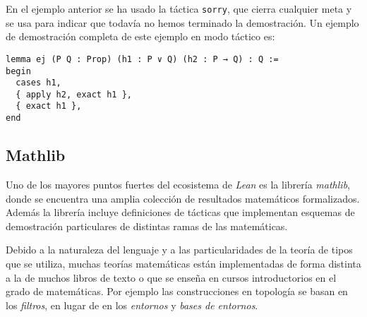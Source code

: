 En el ejemplo anterior se ha usado la táctica \lstinline{sorry}, que cierra
cualquier meta y se usa para indicar que todavía no hemos terminado la
demostración. Un ejemplo de demostración completa de este ejemplo en modo
táctico es:

\begin{lstlisting}
lemma ej (P Q : Prop) (h1 : P ∨ Q) (h2 : P → Q) : Q :=
begin
  cases h1,
  { apply h2, exact h1 },
  { exact h1 },
end
\end{lstlisting}

\subsection{Mathlib}

Uno de los mayores puntos fuertes del ecosistema de \textit{Lean} es la librería
\textit{mathlib}, donde se encuentra una amplia colección de resultados
matemáticos formalizados. Además la librería incluye definiciones de tácticas
que implementan esquemas de demostración particulares de distintas ramas de las
matemáticas.

Debido a la naturaleza del lenguaje y a las particularidades de la teoría de
tipos que se utiliza, muchas teorías matemáticas están implementadas de forma
distinta a la de muchos libros de texto o que se enseña en cursos introductorios
en el grado de matemáticas. Por ejemplo las construcciones en topología se
basan en los \textit{filtros}, en lugar de en los \textit{entornos} y
\textit{bases de entornos}.




















